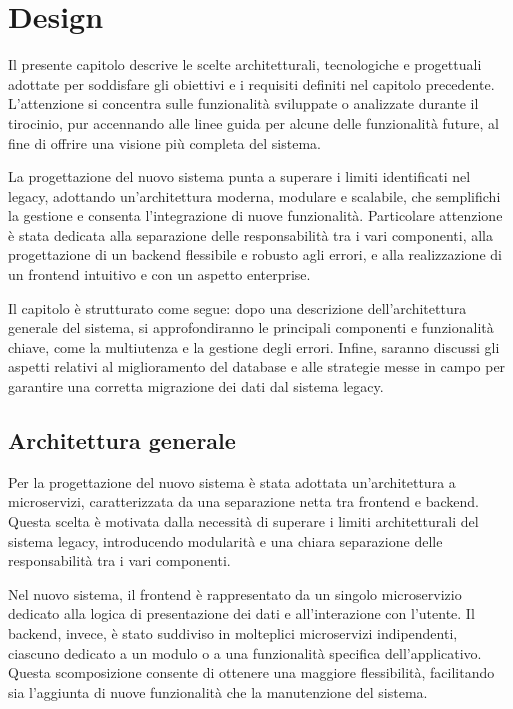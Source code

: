 \chapter{Design}

Il presente capitolo descrive le scelte architetturali, tecnologiche e progettuali adottate per soddisfare gli obiettivi e i requisiti definiti nel capitolo precedente. L'attenzione si concentra sulle funzionalità sviluppate o analizzate durante il tirocinio, pur accennando alle linee guida per alcune delle funzionalità future, al fine di offrire una visione più completa del sistema.

La progettazione del nuovo sistema punta a superare i limiti identificati nel legacy, adottando un'architettura moderna, modulare e scalabile, che semplifichi la gestione e consenta l'integrazione di nuove funzionalità. Particolare attenzione è stata dedicata alla separazione delle responsabilità tra i vari componenti, alla progettazione di un backend flessibile e robusto agli errori, e alla realizzazione di un frontend intuitivo e con un aspetto enterprise.

Il capitolo è strutturato come segue: dopo una descrizione dell’architettura generale del sistema, si approfondiranno le principali componenti e funzionalità chiave, come la multiutenza e la gestione degli errori. Infine, saranno discussi gli aspetti relativi al miglioramento del database e alle strategie messe in campo per garantire una corretta migrazione dei dati dal sistema legacy.

\section{Architettura generale} Per la progettazione del nuovo sistema è stata adottata un'architettura a microservizi, caratterizzata da una separazione netta tra frontend e backend. Questa scelta è motivata dalla necessità di superare i limiti architetturali del sistema legacy, introducendo modularità e una chiara separazione delle responsabilità tra i vari componenti.

Nel nuovo sistema, il frontend è rappresentato da un singolo microservizio dedicato alla logica di presentazione dei dati e all'interazione con l'utente. Il backend, invece, è stato suddiviso in molteplici microservizi indipendenti, ciascuno dedicato a un modulo o a una funzionalità specifica dell'applicativo. Questa scomposizione consente di ottenere una maggiore flessibilità, facilitando sia l'aggiunta di nuove funzionalità che la manutenzione del sistema.

